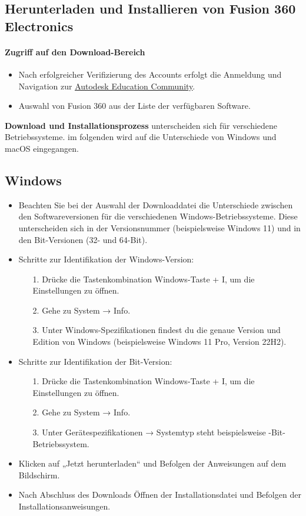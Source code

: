 \subsection*{Herunterladen und Installieren von Fusion 360 Electronics}

\paragraph{Zugriff auf den Download-Bereich}
\begin{itemize}
	\item Nach erfolgreicher Verifizierung des Accounts erfolgt die Anmeldung und Navigation zur \href{https://www.autodesk.com/education/home}{\underline{Autodesk Education Community}}.
	\item Auswahl von Fusion 360 aus der Liste der verfügbaren Software.
\end{itemize}


\textbf{Download und Installationsprozess} unterscheiden sich für verschiedene Betriebssysteme. im folgenden wird auf die Unterschiede von Windows und macOS eingegangen.
\subsection*{Windows}
\begin{itemize}
	\item Beachten Sie bei der Auswahl der Downloaddatei die Unterschiede zwischen den Softwareversionen für die verschiedenen Windows-Betriebssysteme. Diese unterscheiden sich in der Versionsnummer (beispielsweise \glqq Windows 11\grqq {}) und in den Bit-Versionen (32- und 64-Bit).
	\item Schritte zur Identifikation der Windows-Version:
	\begin{itemize}
		\item[1.] Drücke die Tastenkombination Windows-Taste + I, um die Einstellungen zu öffnen.
		\item[2.] Gehe zu System → Info.
		\item[3.] Unter Windows-Spezifikationen findest du die genaue Version und Edition von Windows (beispielsweise \glqq Windows 11 Pro\grqq {}, \glqq Version 22H2\grqq {}).
	\end{itemize}
	\item Schritte zur Identifikation der Bit-Version:
	\begin{itemize}
		\item[1.] Drücke die Tastenkombination Windows-Taste + I, um die Einstellungen zu öffnen.
		\item[2.] Gehe zu System → Info.
		\item[3.] 	Unter Gerätespezifikationen → Systemtyp steht beispielsweise -Bit-Betriebssystem\grqq {}.
	\end{itemize}
	\item Klicken auf „Jetzt herunterladen“ und Befolgen der Anweisungen auf dem Bildschirm.
	\item Nach Abschluss des Downloads Öffnen der Installationsdatei und Befolgen der Installationsanweisungen.
\end{itemize}
